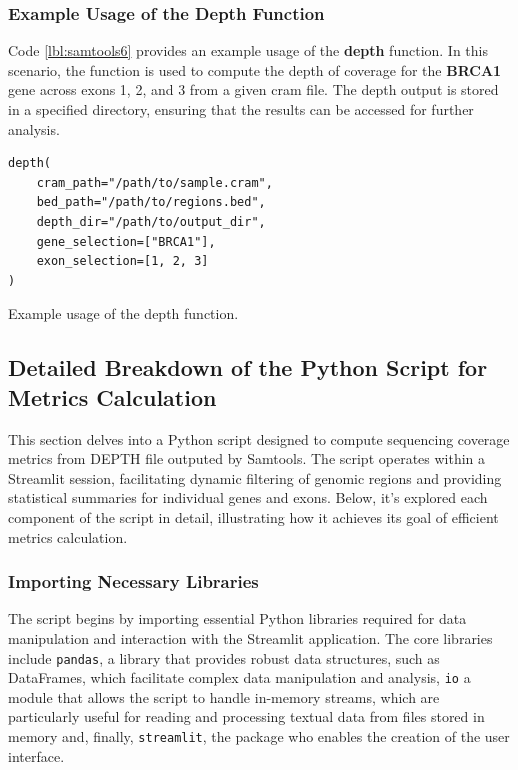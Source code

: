 \subsubsection{\textbf{Example Usage of the Depth Function}}

Code \ref{lbl:samtools6} provides an example usage of the \textbf{depth} function. In this scenario, the function is used to compute the depth of coverage for the \textbf{BRCA1} gene across exons 1, 2, and 3 from a given \ac{cram} file. The depth output is stored in a specified directory, ensuring that the results can be accessed for further analysis.

\begin{longlisting}
\begin{verbatim}
depth(
    cram_path="/path/to/sample.cram", 
    bed_path="/path/to/regions.bed", 
    depth_dir="/path/to/output_dir", 
    gene_selection=["BRCA1"], 
    exon_selection=[1, 2, 3]
)
\end{verbatim}
\caption{Example usage of the depth function.}
\label{lbl:samtools6}
\end{longlisting}

\subsection{Detailed Breakdown of the Python Script for Metrics Calculation}

This section delves into a Python script designed to compute sequencing coverage metrics from DEPTH file outputed by Samtools. The script operates within a Streamlit session, facilitating dynamic filtering of genomic regions and providing statistical summaries for individual genes and exons. Below, it's explored each component of the script in detail, illustrating how it achieves its goal of efficient metrics calculation.

\subsubsection{\textbf{Importing Necessary Libraries}}

The script begins by importing essential Python libraries required for data manipulation and interaction with the Streamlit application. The core libraries include \texttt{pandas}, a library that provides robust data structures, such as DataFrames, which facilitate complex data manipulation and analysis, \texttt{io} a module that allows the script to handle in-memory streams, which are particularly useful for reading and processing textual data from files stored in memory and, finally, \texttt{streamlit}, the package who enables the creation of the user interface.

